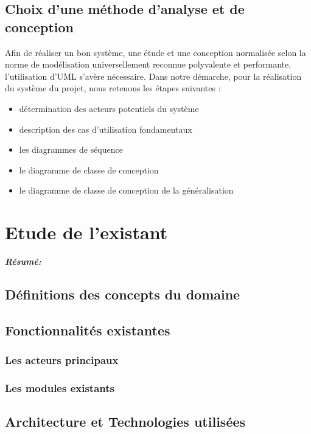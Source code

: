 \documentclass[a4paper, 12pt]{report}
\begin{document}
\section{Choix d'une méthode  d'analyse et de conception}
Afin de réaliser un bon système, une étude et une conception normalisée selon la norme de
modélisation universellement reconnue polyvalente et performante, l’utilisation d’UML
s’avère nécessaire.
Dans notre démarche, pour la réalisation du système du projet, nous retenons les étapes
suivantes :

 \begin{itemize}
    \item détermination des acteurs potentiels du système
    \item description des cas d’utilisation fondamentaux
    \item les diagrammes de séquence
    \item le diagramme de classe de conception
    \item le diagramme de classe de conception de la généralisation
\end{itemize}



\chapter{ Etude de l'existant }
\textit{\textbf{Résumé:} }
\setcounter{minitocdepth}{1}
\minitoc

\section{Définitions des concepts du domaine}

\section{Fonctionnalités existantes}

\subsection{Les acteurs principaux}
\subsection{Les modules existants}


\section{Architecture et Technologies utilisées}
\end{document}
